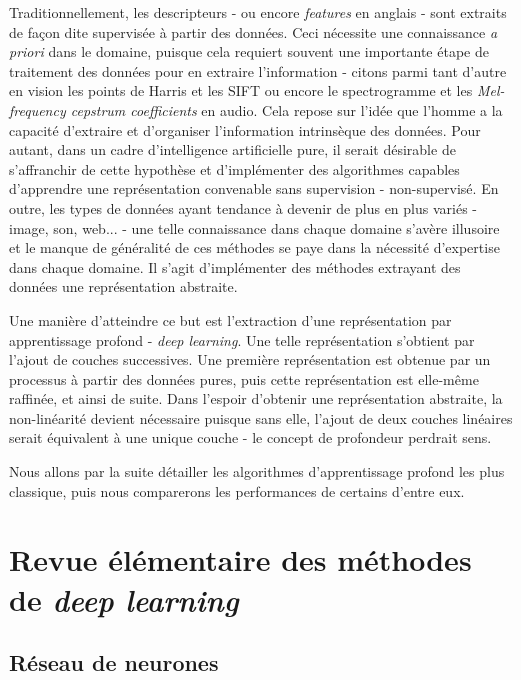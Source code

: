 \documentclass[10pt,a4paper]{article}
\begin{document}
Traditionnellement, les descripteurs - ou encore \emph{features} en anglais - sont extraits de façon dite supervisée à partir des données. Ceci nécessite une connaissance \emph{a priori} dans le domaine, puisque cela requiert souvent une importante étape de traitement des données pour en extraire l'information - citons parmi tant d'autre en vision les points de Harris et les SIFT ou encore le spectrogramme et les \emph{Mel-frequency cepstrum coefficients} en audio. Cela repose sur l'idée que l'homme a la capacité d'extraire et d'organiser l'information intrinsèque des données. Pour autant, dans un cadre d'intelligence artificielle pure, il serait désirable de s'affranchir de cette hypothèse et d'implémenter des algorithmes capables d'apprendre une représentation convenable sans supervision - non-supervisé. En outre, les types de données ayant tendance à devenir de plus en plus variés - image, son, web... - une telle connaissance dans chaque domaine s'avère illusoire et le manque de généralité de ces méthodes se paye dans la nécessité d'expertise dans chaque domaine. Il s'agit d'implémenter des méthodes extrayant des données une représentation abstraite.

Une manière d'atteindre ce but est l'extraction d'une représentation par apprentissage profond - \emph{deep learning}. Une telle représentation s'obtient par l'ajout de couches successives. Une première représentation est obtenue par un processus à partir des données pures, puis cette représentation est elle-même raffinée, et ainsi de suite. Dans l'espoir d'obtenir une représentation abstraite, la non-linéarité devient nécessaire puisque sans elle, l'ajout de deux couches linéaires serait équivalent à une unique couche - le concept de profondeur perdrait sens.

Nous allons par la suite détailler les algorithmes d'apprentissage profond les plus classique, puis nous comparerons les performances de certains d'entre eux. 







\section{Revue élémentaire des méthodes de \emph{deep learning}}

\subsection{Réseau de neurones}
\end{document}
